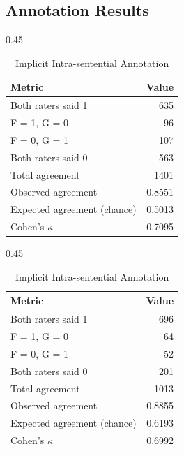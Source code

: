 \documentclass[conference]{IEEEtran}
\begin{document}
\subsection{Annotation Results}
\begin{table}[ht]
  \centering
  \small
  \setlength{\tabcolsep}{6pt}

  \begin{subtable}[t]{0.45\linewidth}
    \centering
    \caption{Explicit Intra-sentential Annotation}
    \begin{tabular}{lr}
      \toprule
      Metric & Value \\
      \midrule
      Both raters said 1 & 635 \\
      F = 1, G = 0      & 96  \\
      F = 0, G = 1      & 107 \\
      Both raters said 0 & 563 \\
      \midrule
      Total agreement            & 1401 \\
      Observed agreement         & 0.8551 \\
      Expected agreement (chance)& 0.5013 \\
      Cohen's $\kappa$           & 0.7095 \\
      \bottomrule
    \end{tabular}
  \end{subtable}\hfill
  \begin{subtable}[t]{0.45\linewidth}
    \centering
    \caption{Implicit Intra-sentential Annotation}
    \begin{tabular}{lr}
      \toprule
      Metric & Value \\
      \midrule
      Both raters said 1 & 696 \\
      F = 1, G = 0      & 64  \\
      F = 0, G = 1      & 52  \\
      Both raters said 0 & 201 \\
      \midrule
      Total agreement            & 1013 \\
      Observed agreement         & 0.8855 \\
      Expected agreement (chance)& 0.6193 \\
      Cohen's $\kappa$           & 0.6992 \\
      \bottomrule
    \end{tabular}
  \end{subtable}

  \vspace{1em}


\end{table}
\end{document}
